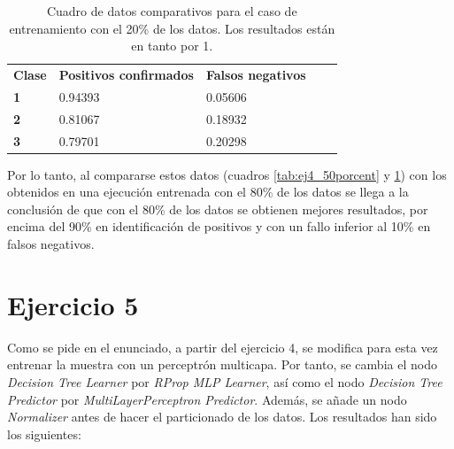 \documentclass[10pt,a4paper]{article}
\begin{document}
\begin{table}[h!]
\centering
\begin{tabular}{|l|l|l|ll}
\cline{1-3}
\multicolumn{1}{|c|}{\textbf{Clase}} & \multicolumn{1}{c|}{\textbf{Positivos confirmados}} & \multicolumn{1}{c|}{\textbf{Falsos negativos}} & \multicolumn{1}{c}{\textbf{}} &  \\ \cline{1-3}
\textbf{1}                       &         0.94393                       &       0.05606                         &                               &  \\ \cline{1-3}
\textbf{2}                       &         0.81067                       &       0.18932                         &                               &  \\ \cline{1-3}
\textbf{3}                       &         0.79701                       &       0.20298                         &                               &  \\ \cline{1-3}
\end{tabular}
\caption{Cuadro de datos comparativos para el caso de entrenamiento con el 20\%{} de los datos. Los resultados están en tanto por 1.}
\label{tab:ej4_20porcent}
\end{table}

Por lo tanto, al compararse estos datos (cuadros \ref{tab:ej4_50porcent} y \ref{tab:ej4_20porcent}) con los obtenidos en una ejecución entrenada con el 80\%{} de los datos se llega a la conclusión de que con el 80\%{} de los datos se obtienen mejores resultados, por encima del 90\%{} en identificación de positivos y con un fallo inferior al 10\%{} en falsos negativos.

\newpage
\section{Ejercicio 5}
Como se pide en el enunciado, a partir del ejercicio 4, se modifica para esta vez entrenar la muestra con un perceptrón multicapa. Por tanto, se cambia el nodo \emph{Decision Tree Learner} por \emph{RProp MLP Learner}, así como el nodo \emph{Decision Tree Predictor} por \emph{MultiLayerPerceptron Predictor}. Además, se añade un nodo \emph{Normalizer} antes de hacer el particionado de los datos. 
Los resultados han sido los siguientes:
\end{document}
